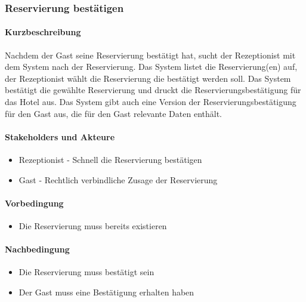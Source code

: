 \subsubsection{Reservierung bestätigen}

\paragraph{Kurzbeschreibung}
Nachdem der \Gls{Gast} seine \Gls{Reservierung} bestätigt hat, sucht der \Gls{Rezeptionist} mit dem System nach der \Gls{Reservierung}. Das System listet die \Gls{Reservierung}(en) auf, der \Gls{Rezeptionist} wählt die \Gls{Reservierung} die bestätigt werden soll. Das System bestätigt die gewählte \Gls{Reservierung} und druckt die Reservierungsbestätigung für das Hotel aus. Das System gibt auch eine Version der Reservierungsbestätigung für den \Gls{Gast} aus, die für den \Gls{Gast} relevante Daten enthält.

\paragraph{Stakeholders und Akteure}
\begin{itemize}
	\item \Gls{Rezeptionist} - Schnell die Reservierung bestätigen
	\item \Gls{Gast} - Rechtlich verbindliche Zusage der Reservierung
\end{itemize}

\paragraph{Vorbedingung}
\begin{itemize}
	\item Die Reservierung muss bereits existieren
\end{itemize}

\paragraph{Nachbedingung}
\begin{itemize}
	\item Die \Gls{Reservierung} muss bestätigt sein
	\item Der \Gls{Gast} muss eine Bestätigung erhalten haben
\end{itemize}

